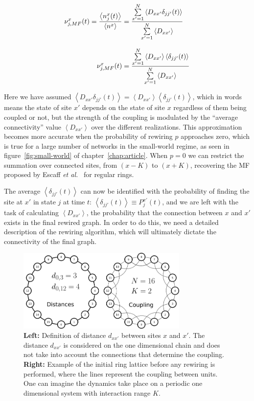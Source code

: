 \begin{align}
    \nu^x_{j,MF}(t) = \frac{\left<n^x_j(t)\right>}{\left<n^x\right>} &= \frac{\sum\limits_{x'=1}^N\left< D_{xx'}\delta_{jj'}(t)\right>}{\sum\limits_{x'=1}^N\left< D_{xx'} \right>}
    \notag \\[8pt]
    \nu^x_{j,MF}(t) &= \frac{\sum\limits_{x'=1}^N\left< D_{xx'}\right>\left<\delta_{jj'}(t)\right>}{\sum\limits_{x'=1}^N\left< D_{xx'} \right>}
    \label{eq:numf}
\end{align}

\noindent Here we have assumed $\left< D_{xx'}\delta_{jj'}(t)\right> = \left< D_{xx'}\right>\left<\delta_{jj'}(t)\right>$, which in
words means the state of site $x'$ depends on the state of site $x$ regardless of them being coupled or not, but the strength of the
coupling is modulated by the ``average connectivity'' value $\left< D_{xx'} \right>$ over the different realizations. This
approximation becomes more accurate when the probability of rewiring $p$ approaches zero, which is true for a large number of networks
in the small-world regime, as seen in figure~\ref{fig:small-world} of chapter~\ref{chap:article}. When $p=0$ we can restrict the
summation over connected sites, from $(x-K)$ to $(x+K)$, recovering the MF proposed by Escaff \textit{et al.}~\cite{escaff2014arrays}
for regular rings.

The average $\left< \delta_{jj'}(t) \right>$ can now be identified with the probability of finding the site at $x'$ in state $j$ at
time $t$: $\left< \delta_{jj'}(t) \right> \equiv P_j^{x'}(t)$, and we are left with the task of calculating $\left< D_{xx'} \right>$,
the probability that the connection between $x$ and $x'$ exists in the final rewired graph.  In order to do this, we need a detailed
description of the rewiring algorithm, which will ultimately dictate the connectivity of the final graph. 

\begin{figure}
    \centering
    \includegraphics[width=0.75\textwidth]{fig/ring-distance.png}
    \caption{\label{fig:ring-distance}
        \textbf{Left:} Definition of distance $d_{xx'}$ between sites $x$ and $x'$. The distance $d_{xx'}$ is considered on the one
        dimensional chain and does not take into account the connections that determine the coupling.\\
        \textbf{Right:} Example of the initial ring lattice before any rewiring is performed, where the lines represent the coupling
        between units.\\
        One can imagine the dynamics take place on a periodic one dimensional system with interaction range $K$.
    }
\end{figure}

